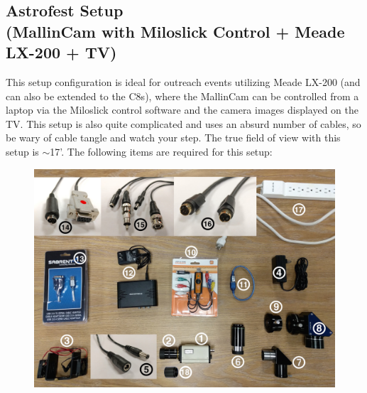 \documentclass[12pt,titlepage]{article}
\begin{document}
\subsection{Astrofest Setup\\
\small(MallinCam with Miloslick Control + Meade LX-200 + TV)}
This setup configuration is ideal for outreach events utilizing Meade LX-200 (and can also be extended to the C8s), where the MallinCam can be controlled from a laptop via the Miloslick control software and the camera images displayed on the TV.
This setup is also quite complicated and uses an absurd number of cables, so be wary of cable tangle and watch your step.
The true field of view with this setup is $\sim$17'.
The following items are required for this setup:

\begin{figure}[H] 
	\begin{center}
		\includegraphics[width=.95\textwidth]{./images/MallinCam/astrofest_setup/equipment_numbered.jpg} 
	\end{center}
\end{figure}
\end{document}
